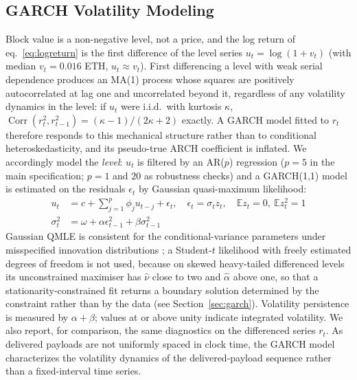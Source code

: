 \documentclass[11pt]{article}
\providecommand{\E}{\mathbb{E}}
\begin{document}
\subsection{GARCH Volatility Modeling}

Block value is a non-negative level, not a price, and the log return of
eq.~\ref{eq:logreturn} is the first difference of the level series
$u_t = \log(1+v_t)$ (with median $v_t = 0.016$ ETH, $u_t \approx v_t$). First
differencing a level with weak serial dependence produces an MA(1) process
whose squares are positively autocorrelated at lag one and uncorrelated beyond
it, regardless of any volatility dynamics in the level: if $u_t$ were i.i.d.\
with kurtosis $\kappa$, $\operatorname{Corr}(r_t^2, r_{t-1}^2) =
(\kappa-1)/(2\kappa+2)$ exactly. A GARCH model fitted to $r_t$ therefore
responds to this mechanical structure rather than to conditional
heteroskedasticity, and its pseudo-true ARCH coefficient is inflated. We
accordingly model the \emph{level}: $u_t$ is filtered by an AR($p$) regression
($p = 5$ in the main specification; $p = 1$ and $20$ as robustness checks) and
a GARCH(1,1) model is estimated on the residuals $\epsilon_t$ by Gaussian
quasi-maximum likelihood:
\begin{align}
u_t &= c + \sum_{j=1}^{p} \phi_j u_{t-j} + \epsilon_t, \quad \epsilon_t = \sigma_t z_t, \quad \E z_t = 0,\ \E z_t^2 = 1 \label{eq:garchmean} \\
\sigma_t^2 &= \omega + \alpha \epsilon_{t-1}^2 + \beta \sigma_{t-1}^2 \label{eq:garchvar}
\end{align}
Gaussian QMLE is consistent for the conditional-variance parameters under
misspecified innovation distributions \citep{bollerslevwooldridge1992}; a Student-$t$
likelihood with freely estimated degrees of freedom is not used, because on
skewed heavy-tailed differenced levels its unconstrained maximiser has
$\hat\nu$ close to two and $\hat\alpha$ above one, so that a
stationarity-constrained fit returns a boundary solution determined by the
constraint rather than by the data (see Section~\ref{sec:garch}). Volatility persistence
is measured by $\alpha + \beta$; values at or above unity indicate integrated
volatility. We also report, for comparison, the same diagnostics on the
differenced series $r_t$. As delivered payloads are not uniformly spaced in clock time, the
GARCH model characterizes the volatility dynamics of the delivered-payload
sequence rather than a fixed-interval time series.
\end{document}
